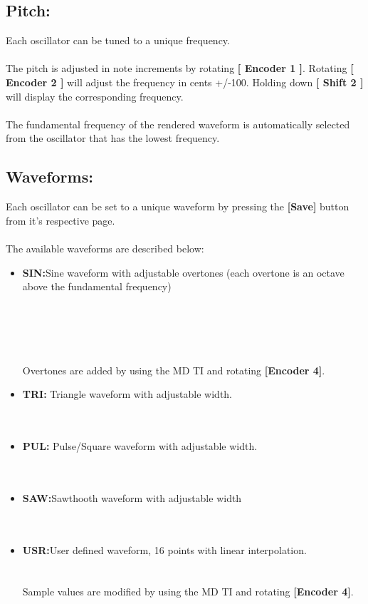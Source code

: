 \subsection{Pitch:}
Each oscillator can be tuned to a unique frequency.\\
\\The pitch is adjusted in note increments by rotating \textbf{[ Encoder 1 ]}. Rotating \textbf{[ Encoder 2 ]} will adjust the frequency in cents +/-100. Holding down \textbf{[ Shift 2 ]} will display the corresponding frequency.\\
\\The fundamental frequency of the rendered waveform is automatically selected from the oscillator that has the lowest frequency.
\subsection{Waveforms:}
Each oscillator can be set to a unique waveform by pressing the \textbf{[Save]} button from it's respective page.\\
\\
The available waveforms are described below:

\begin{itemize}
\item{\textbf{SIN:}}Sine waveform with adjustable overtones (each overtone is an octave above the fundamental frequency)\\
\\\\
\\\\
\\Overtones are added by using the MD TI and rotating \textbf{[Encoder 4]}.
\item{\textbf{TRI:}} Triangle waveform with adjustable width.\\
\\\\
\item{\textbf{PUL:}} Pulse/Square waveform with adjustable width.\\
\\\\
\item{\textbf{SAW:}}Sawthooth waveform with adjustable width\\
\\\\
\item{\textbf{USR:}}User defined waveform, 16 points with linear interpolation.\\
\\\\
Sample values are modified by using the MD TI and rotating \textbf{[Encoder 4]}.
\end{itemize}
